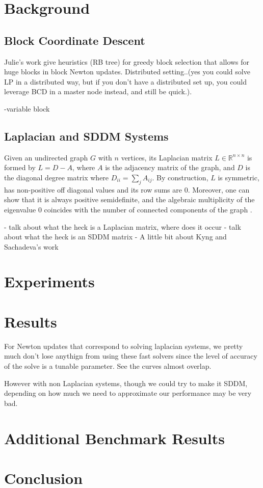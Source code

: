 \documentclass[11pt]{article}
\theoremstyle{definition}
\theoremstyle{definition}
\newcommand{\R}{\mathbb{R}}%
\begin{document}
\section{Background}
\subsection{Block Coordinate Descent}
Julie's work give heuristics (RB tree) for greedy block selection that allows for huge blocks in block Newton updates. Distributed setting..(yes you could solve LP in a distributed way, but if you don't have a distributed set up, you could leverage BCD in a master node instead, and still be quick.). 

-variable block
\subsection{Laplacian and SDDM Systems}
Given an undirected graph $G$ with $n$ vertices, its Laplacian matrix $L\in\R^{n\times n}$ is formed by $L=D-A$, where $A$ is the adjacency matrix of the graph, and $D$ is the diagonal degree matrix where $D_{ii}=\sum_{j}A_{ij}$. By construction, $L$ is symmetric, has non-positive off diagonal values and its row sums are $0$. Moreover, one can show that it is always positive semidefinite, and the algebraic multiplicity of the eigenvalue $0$ coincides with the number of connected components of the graph .


- talk about what the heck is a Laplacian matrix, where does it occur
- talk about what the heck is an SDDM matrix
- A little bit about Kyng and Sachadeva's work

\section{Experiments}
\section{Results}
For Newton updates that correspond to solving laplacian systems, we pretty much don't lose anythign from using these fast solvers since the level of accuracy of the solve is a tunable parameter. See the curves almost overlap. 

However with non Laplacian systems, though we could try to make it SDDM, depending on how much we need to approximate our performance may be very bad.
\section{Additional Benchmark Results}
\section{Conclusion}




\end{document}
